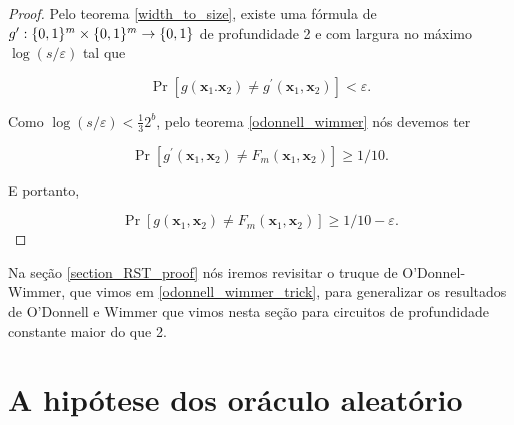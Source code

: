 \begin{proof}

Pelo teorema \ref{width_to_size}, existe uma fórmula de $g^{\prime}: \{0, 1\}^{m} \times \{0, 1\}^{m} \to \{0, 1\}$ de profundidade 2 e com largura no máximo $\log(s/\varepsilon)$ tal que

\begin{equation*}
    \Pr[g(\boldsymbol{x}_{1}. \boldsymbol{x}_{2}) \neq g^{\prime}(\boldsymbol{x}_{1}, \boldsymbol{x}_{2})] < \varepsilon.
\end{equation*}

Como $\log(s/\varepsilon) < \frac{1}{3}2^{b}$, pelo teorema \ref{odonnell_wimmer} nós devemos ter

\begin{equation*}
    \Pr[g^{\prime}(\boldsymbol{x}_{1}, \boldsymbol{x}_{2}) \neq F_{m}(\boldsymbol{x}_{1}, \boldsymbol{x}_{2})] \geq 1/10.
\end{equation*}

E portanto,

\begin{equation*}
    \Pr[g(\boldsymbol{x}_{1}, \boldsymbol{x}_{2}) \neq F_{m}(\boldsymbol{x}_{1}, \boldsymbol{x}_{2})] \geq 1/10 - \varepsilon.
\end{equation*}

\end{proof}

Na seção \ref{section_RST_proof} nós iremos revisitar o truque de O'Donnel-Wimmer, que vimos em \ref{odonnell_wimmer_trick}, para generalizar os resultados de O'Donnell e Wimmer que vimos nesta seção para circuitos de profundidade constante maior do que 2.

\section{A hipótese dos oráculo aleatório} \label{section_random_oracle_hypothesis}